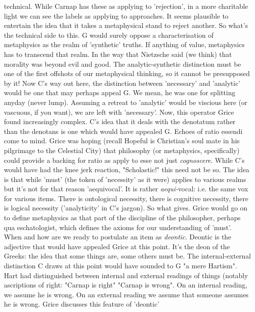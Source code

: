 \documentclass[10pt,titlepage]{book}
\begin{document}
technical. While Carnap has these as applying to 'rejection', in a more  
charitable light we can see the labels as applying to approaches. It seems  
plausible to entertain the idea that it takes a metaphysical stand to reject  
another. So what's the technical side to this. G would surely oppose a  
characterisation of metaphysics as the realm of 'synthetic' truths. If anything  
of value, metaphysics has to transcend that realm. In the way that 
Nietzsche  said (we think) that morality was beyond evil and good. The 
analytic-synthetic  distinction must be one of the first offshots of our metaphysical 
thinking, so  it cannot be presupposed by it! Now C's way out here, the 
distinction between  'necessary' and 'analytic' would be one that may perhaps 
appeal G. We mean, he  was one for splitting anyday (never lump). Assuming a 
retreat to 'analytic'  would be viscious here (or vascuous, if you want), we 
are left with 'necessary'.  Now, this operator Grice found increasingly 
complex. C's idea that it deals with  the denotatum rather than the denotans is 
one which would have appealed G.  Echoes of ratio essendi come to mind. Grice 
was hoping (recall Hopeful is  Christian's soul mate in his pilgrimage to 
the Celestial City) that philosophy  (or metaphysics, specifically) could 
provide a backing for ratio as apply to  esse not just {\it cognoscere}. While 
C's would have had the knee jerk reaction,  "Scholastic!" this need not be so. 
The idea is that while 'must' (the token of  'necessity' as it were) 
applies to various realms but it's not for that reason  'aequivocal'. It is rather 
{\it aequi-}vocal: i.e. the same vox for various items.  There is ontological 
necessity, there is cognitive necessity, there is logical  necessity 
('analyticity' in C's jargon). So what gives. Grice would go on to  define 
metaphysics as that part of the discipline of the philosopher, perhaps  qua 
eschatologist, which defines the axioms for our understanding of 'must'.  When and 
how are we ready to postulate an item as {\it deontic}. Deontic is the  
adjective that would have appealed Grice at this point. It's the deon of the  
Greeks: the idea that some things are, some others must be. The  internal-external 
distinction C draws at this point would have sounded to G "a  mere 
Hartism". Hart had distinguished between internal and external readings of  things 
(notably ascriptions of right: "Carnap is right" "Carnap is wrong". On an  
internal reading, we assume he is wrong. On an external reading we assume 
that  someone assumes he is wrong. Grice discusses this feature of 'deontic' 
\end{document}
